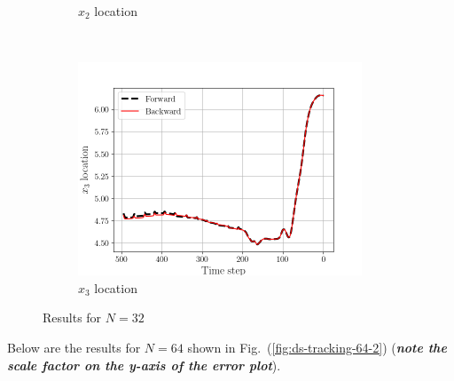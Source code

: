 \begin{figure}[H]
\begin{subfigure}[H]{0.45\textwidth}
        \caption{$x_{2}$ location}
    \end{subfigure}
    ~
    \begin{subfigure}[H]{0.45\textwidth}
        \includegraphics[height=2.5in]{media/rk4/DS-N-32/x3-location.png}
        \caption{$x_{3}$ location}
    \end{subfigure}
    \caption{Results for $N=32$}
    \label{fig:ds-tracking-32-2}
\end{figure}
\newpage 
Below are the results for $N=64$ shown in
Fig.~(\ref{fig:ds-tracking-64-2}) (\emph{\textbf{note the scale factor on the
y-axis of the error plot}}).
